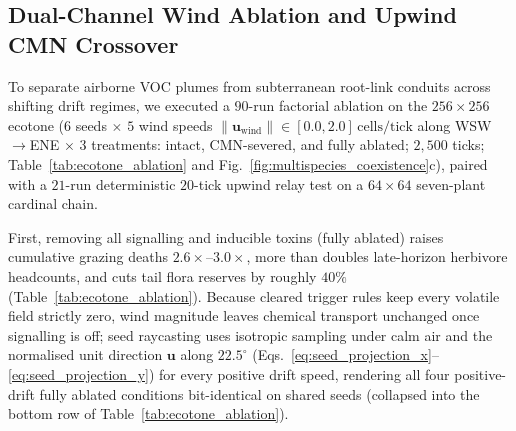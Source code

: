 \subsection{Dual-Channel Wind Ablation and Upwind CMN Crossover}
\label{sec:ecotone_ablation}

To separate airborne VOC plumes from subterranean root-link conduits across shifting drift regimes, we executed a $90$-run factorial ablation on the $256 \times 256$ ecotone ($6$ seeds $\times$ $5$ wind speeds $\|\mathbf{u}_{\text{wind}}\| \in [0.0, 2.0]\,\text{cells/tick}$ along WSW$\to$ENE $\times$ $3$ treatments: intact, CMN-severed, and fully ablated; $2{,}500$ ticks; Table~\ref{tab:ecotone_ablation} and Fig.~\ref{fig:multispecies_coexistence}c), paired with a $21$-run deterministic $20$-tick upwind relay test on a $64 \times 64$ seven-plant cardinal chain.

First, removing all signalling and inducible toxins (fully ablated) raises cumulative grazing deaths $2.6\times\text{--}3.0\times$, more than doubles late-horizon herbivore headcounts, and cuts tail flora reserves by roughly $40\%$ (Table~\ref{tab:ecotone_ablation}). Because cleared trigger rules keep every volatile field strictly zero, wind magnitude leaves chemical transport unchanged once signalling is off; seed raycasting uses isotropic sampling under calm air and the normalised unit direction $\mathbf{u}$ along $22.5^\circ$ (Eqs.~\eqref{eq:seed_projection_x}--\eqref{eq:seed_projection_y}) for every positive drift speed, rendering all four positive-drift fully ablated conditions bit-identical on shared seeds (collapsed into the bottom row of Table~\ref{tab:ecotone_ablation}).

